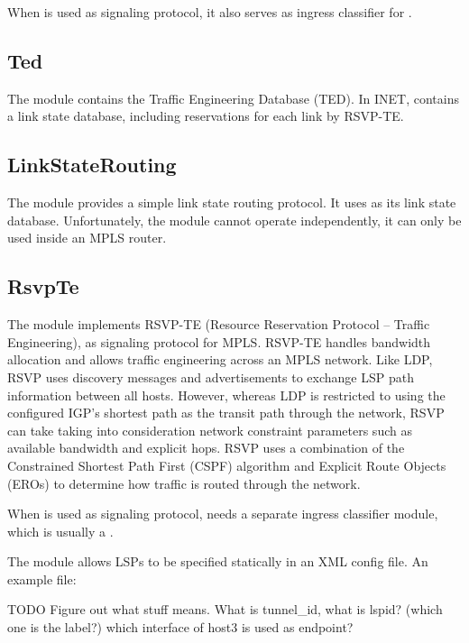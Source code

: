 When  is used as signaling protocol, it also serves as ingress
classifier for .

\subsection{Ted}

The  module contains the Traffic Engineering Database (TED). 
In INET,  contains a link state database, including reservations
for each link by RSVP-TE.

\subsection{LinkStateRouting}

The  module provides a simple link state routing
protocol. It uses  as its link state database. Unfortunately, the
 module cannot operate independently, it can only be
used inside an MPLS router.

 \subsection{RsvpTe}

The  module implements RSVP-TE (Resource Reservation Protocol --
Traffic Engineering), as signaling protocol for MPLS. RSVP-TE handles bandwidth
allocation and allows traffic engineering across an MPLS network. Like LDP, RSVP
uses discovery messages and advertisements to exchange LSP path information
between all hosts. However, whereas LDP is restricted to using the configured
IGP's shortest path as the transit path through the network, RSVP can take
taking into consideration network constraint parameters such as available
bandwidth and explicit hops. RSVP uses a combination of the Constrained Shortest
Path First (CSPF) algorithm and Explicit Route Objects (EROs) to determine how
traffic is routed through the network.

When  is used as signaling protocol,  needs a
separate ingress classifier module, which is usually a .

The  module allows LSPs to be specified statically in an XML
config file. An example  file:

TODO Figure out what stuff means. What is tunnel\_id, what is lspid? (which one is the label?)
which interface of host3 is used as endpoint?

